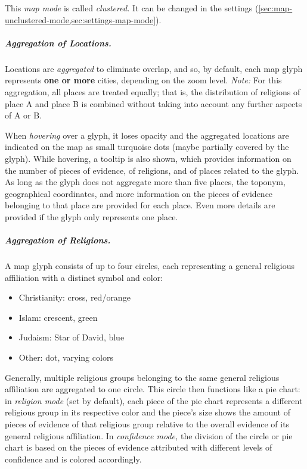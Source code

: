 This \emph{map mode} is called \emph{clustered.}
It can be changed in the settings (\cref{sec:map-unclustered-mode,sec:settings-map-mode}).


\subparagraph{Aggregation of Locations.}
Locations are \emph{aggregated} to eliminate overlap, and so, by default, each map glyph represents \textbf{one or more} cities, depending on the zoom level.
\emph{Note:} For this aggregation, all places are treated equally;
that is, the distribution of religions of place A and place B is combined without taking into account any further aspects of A or B.

\label{sec:map-glyph-hovering-tooltip}
When \emph{hovering} over a glyph, it loses opacity and the aggregated locations are indicated on the map as small turquoise dots (maybe partially covered by the glyph).
While hovering, a tooltip is also shown, which provides information on the number of pieces of evidence, of religions, and of places related to the glyph.
As long as the glyph does not aggregate more than five places, the toponym, geographical coordinates, and more information on the pieces of evidence belonging to that place are provided for each place.
Even more details are provided if the glyph only represents one place.

\subparagraph{Aggregation of Religions.}
A map glyph consists of up to four circles, each representing a general religious affiliation with a distinct symbol and color:

\begin{itemize}
  \item Christianity: cross, red/orange
  \item Islam: crescent, green
  \item Judaism: Star of David, blue
  \item Other: dot, varying colors
\end{itemize}

Generally, multiple religious groups belonging to the same general religious affiliation are aggregated to one circle.
This circle then functions like a pie chart:
in \emph{religion mode} (set by default), each piece of the pie chart represents a different religious group in its respective color and the piece's size shows the amount of pieces of evidence of that religious group relative to the overall evidence of its general religious affiliation.
In \emph{confidence mode,} the division of the circle or pie chart is based on the pieces of evidence attributed with different levels of confidence and is colored accordingly.

